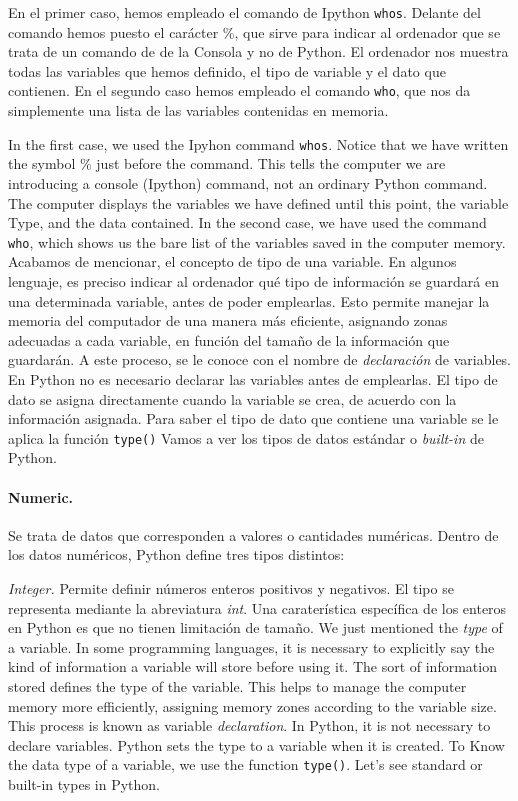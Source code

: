 \begin{paracol}{2}
 En el primer caso, hemos empleado el comando de Ipython \texttt{whos}. Delante del comando hemos puesto el carácter \%, que sirve para indicar al ordenador que se trata de un comando de de la Consola y no de Python. El ordenador nos muestra todas las variables que hemos definido, el tipo de variable y el dato que contienen. En el segundo caso hemos empleado el comando \texttt{who}, que nos da simplemente una lista de las variables contenidas en memoria. 

 \switchcolumn
 In the first case, we used the Ipyhon command \texttt{whos}. Notice that we have written the symbol \% just before the command. This tells the computer we are introducing a console (Ipython) command, not an ordinary Python command. The computer displays the variables we have defined until this point, the variable Type, and the data contained. In the second case, we have used the command \texttt{who}, which shows us the bare list of the variables saved in the computer memory.
 \switchcolumn Acabamos de mencionar, el concepto de tipo de una variable. En algunos lenguaje, es preciso indicar al ordenador qué tipo de información se guardará en una determinada variable, antes de poder emplearlas. Esto permite manejar la memoria del computador de una manera más eficiente, asignando zonas adecuadas a cada variable, en función del tamaño de la información que guardarán. A este proceso, se le conoce con el nombre de \emph{declaración} de variables. En Python no es necesario declarar las variables antes de emplearlas. El tipo de dato se asigna directamente cuando la variable se crea, de acuerdo con la información asignada. Para saber el tipo de dato que contiene una variable se le aplica la función \texttt{type()} Vamos a ver los tipos de datos estándar o \emph{built-in} de Python.

\paragraph{Numeric.} Se trata de datos que corresponden a valores o cantidades numéricas. Dentro de los datos numéricos, Python define tres tipos distintos:

\emph{Integer.} Permite definir números enteros positivos y negativos. El tipo se representa mediante la abreviatura \emph{int}. Una caraterística específica de los enteros en Python es que no tienen limitación de tamaño.
\switchcolumn
We just mentioned the \emph{type} of a variable. In some programming languages, it is necessary to explicitly say the kind of information a variable will store before using it. The sort of information stored defines the type of the variable. This helps to manage the computer memory more efficiently, assigning memory zones according to the variable size. This process is known as variable \emph{declaration}. In Python, it is not necessary to declare variables. Python sets the type to a variable when it is created. To Know the data type of a variable, we use the function \texttt{type()}. Let's see standard or built-in types in Python.


\end{paracol}
